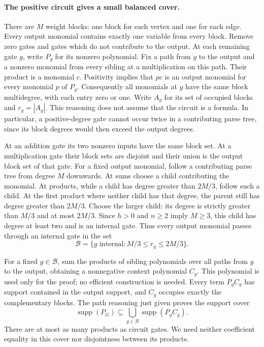 \paragraph{The positive circuit gives a small balanced cover.}
There are $M$ weight blocks: one block for each vertex and one
for each edge. Every output monomial contains exactly one
variable from every block. Remove zero gates and gates which
do not contribute to the output. At each remaining gate $g$,
write $P_g$ for its nonzero polynomial. Fix a path from $g$
to the output and a nonzero monomial from every sibling at a
multiplication on this path. Their product is a monomial $c$.
Positivity implies that $pc$ is an output monomial for every
monomial $p$ of $P_g$. Consequently all monomials at $g$ have
the same block multidegree, with each entry zero or one.
Write $A_g$ for its set of occupied blocks and $r_g=|A_g|$.
This reasoning does not assume that the circuit is a formula.
In particular, a positive-degree gate cannot occur twice in
a contributing parse tree, since its block degrees would
then exceed the output degrees.

At an addition gate its two nonzero inputs have the same
block set. At a multiplication gate their block sets are
disjoint and their union is the output block set of that gate.
For a fixed output monomial, follow a contributing parse tree
from degree $M$ downwards. At sums choose a child contributing
the monomial. At products, while a child has degree greater
than $2M/3$, follow such a child. At the first product where
neither child has that degree, the parent still has degree
greater than $2M/3$. Choose the larger child: its degree is
strictly greater than $M/3$ and at most $2M/3$. Since
$h>0$ and $n\ge2$ imply $M\ge3$, this child has degree at
least two and is an internal gate. Thus every output monomial
passes through an internal gate
in the set
\[
             \mathcal B=\{g\text{ internal}:M/3\le r_g\le2M/3\}.
\]

For a fixed $g\in\mathcal B$, sum the products of sibling
polynomials over all paths from $g$ to the output, obtaining
a nonnegative context polynomial $C_g$. This polynomial is
used only for the proof; no efficient construction is needed.
Every term $P_gC_g$ has support contained in the output
support, and $C_g$ occupies exactly the complementary blocks.
The path reasoning just given proves the support cover
\begin{equation}\label{eq:S019-cover}
 \operatorname{supp}(P_G)\subseteq
       \bigcup_{g\in\mathcal B}\operatorname{supp}(P_gC_g).
\end{equation}
There are at most as many products as circuit gates. We need
neither coefficient equality in this cover nor disjointness
between its products.

